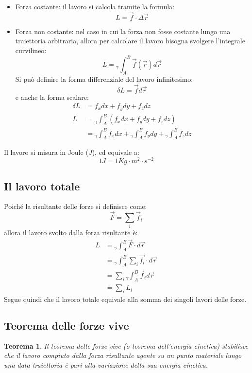 \documentclass[11pt, a4paper, openright]{book}
\theoremstyle{plain}
\newtheorem{theorem}{Teorema}[section]
\theoremstyle{definition}
\begin{document}
\begin{itemize}
    \item Forza costante: il lavoro si calcola tramite la formula:
    \begin{equation*}
        L = \vec{f}\cdot \Delta\vec{r}
    \end{equation*}
    \item Forza non costante: nel caso in cui la forza non fosse costante lungo una traiettoria arbitraria, allora per calcolare il lavoro bisogna svolgere l'integrale curvilineo:
    \begin{equation*}
        L = {}_{\gamma}\int_A^B \vec{f}(\vec{r}) d\vec{r}
    \end{equation*}
    Si può definire la forma differenziale del lavoro infinitesimo:
    \[\delta L = \vec{f}d\vec{r}\]
    e anche la forma scalare:
    \begin{align}
        \delta L & = f_xdx + f_ydy + f_zdz \\
        L & = {}_\gamma\int_A^B (f_xdx + f_ydy + f_zdz) \\ 
          & = {}_\gamma\int_A^B f_xdx + {}_\gamma\int_A^B f_ydy + {}_\gamma\int_A^B f_zdz
    \end{align}
\end{itemize}
Il lavoro si misura in Joule ($J$), ed equivale a:
\[1 J = 1Kg \cdot m^{2} \cdot s^{-2}\]

\subsection{Il lavoro totale}
Poiché la risultante delle forze si definisce come:
\[\vec{F} = \sum_i \vec{f}_i\]
allora il lavoro svolto dalla forza risultante è:
\begin{align}
    L & = {}_\gamma\int_A^B \vec{F}\cdot d\vec{r} \\
      & = {}_\gamma\int_A^B \sum_i \vec{f_i}\cdot d\vec{r} \\
      & = \sum_i {}_\gamma\int_A^B \vec{f}_i d\vec{r} \\
      & = \sum_i L_i
\end{align}
Segue quindi che il lavoro totale equivale alla somma dei singoli lavori delle forze.

\subsection{Teorema delle forze vive}
\begin{theorem}
Il teorema delle forze vive (o teorema dell'energia cinetica) stabilisce che il lavoro compiuto dalla forza risultante agente su un punto materiale lungo una data traiettoria è pari alla variazione della sua energia cinetica.
\end{theorem}
\end{document}
